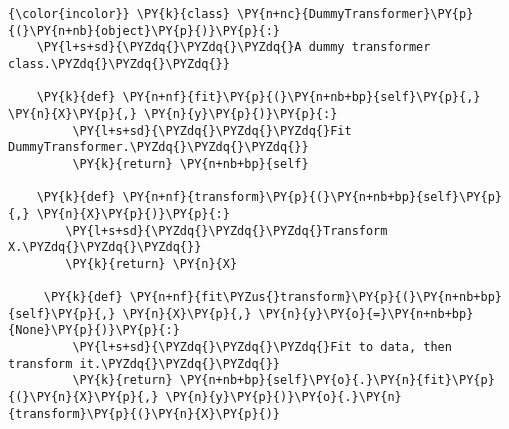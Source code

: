 
{\small
\begin{Verbatim}[commandchars=\\\{\}, frame=single]
{\color{incolor}} \PY{k}{class} \PY{n+nc}{DummyTransformer}\PY{p}{(}\PY{n+nb}{object}\PY{p}{)}\PY{p}{:}
    \PY{l+s+sd}{\PYZdq{}\PYZdq{}\PYZdq{}A dummy transformer class.\PYZdq{}\PYZdq{}\PYZdq{}}
    
    \PY{k}{def} \PY{n+nf}{fit}\PY{p}{(}\PY{n+nb+bp}{self}\PY{p}{,} \PY{n}{X}\PY{p}{,} \PY{n}{y}\PY{p}{)}\PY{p}{:}
         \PY{l+s+sd}{\PYZdq{}\PYZdq{}\PYZdq{}Fit DummyTransformer.\PYZdq{}\PYZdq{}\PYZdq{}}
         \PY{k}{return} \PY{n+nb+bp}{self}
             
    \PY{k}{def} \PY{n+nf}{transform}\PY{p}{(}\PY{n+nb+bp}{self}\PY{p}{,} \PY{n}{X}\PY{p}{)}\PY{p}{:}
        \PY{l+s+sd}{\PYZdq{}\PYZdq{}\PYZdq{}Transform X.\PYZdq{}\PYZdq{}\PYZdq{}}
        \PY{k}{return} \PY{n}{X}
                 
     \PY{k}{def} \PY{n+nf}{fit\PYZus{}transform}\PY{p}{(}\PY{n+nb+bp}{self}\PY{p}{,} \PY{n}{X}\PY{p}{,} \PY{n}{y}\PY{o}{=}\PY{n+nb+bp}{None}\PY{p}{)}\PY{p}{:}
         \PY{l+s+sd}{\PYZdq{}\PYZdq{}\PYZdq{}Fit to data, then transform it.\PYZdq{}\PYZdq{}\PYZdq{}}
         \PY{k}{return} \PY{n+nb+bp}{self}\PY{o}{.}\PY{n}{fit}\PY{p}{(}\PY{n}{X}\PY{p}{,} \PY{n}{y}\PY{p}{)}\PY{o}{.}\PY{n}{transform}\PY{p}{(}\PY{n}{X}\PY{p}{)}
\end{Verbatim}
}


%             
%             
%                 
